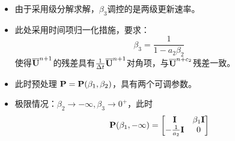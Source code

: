 \documentclass[aspectratio=169,serif]{beamer} %
\begin{document}
\begin{frame}{\secname}
  \begin{itemize}
    \item 由于采用级分解求解，$\beta_3$调控的是两级更新速率。
    \item 此处采用时间项归一化措施，要求：
          \begin{equation}
            \beta_3 = \frac{1}{1-a_2\beta_2}
          \end{equation}
          使得$\overline{\mathbf{U}}^{n+1}$的残差具有$\frac{1}{{\Delta} t}{\overline{\mathbf{U}}^{n+1}}$对角项，与$\overline{\mathbf{U}}^{n+c_2}$残差一致。
    \item 此时预处理 $\mathbf{P}=\mathbf{P}(\beta_1,\beta_2)$，具有两个可调参数。
    \item 极限情况：$\beta_2\rightarrow-\infty, \beta_3\rightarrow 0^+$，此时
          \begin{equation}
            \mathbf{P}(\beta_1,-\infty) = \begin{bmatrix}
              \mathbf{I}                 & \beta_1 \mathbf{I} \\
              - \frac{1}{a_2} \mathbf{I} & 0            \\
            \end{bmatrix}
          \end{equation}
  \end{itemize}
\end{frame}
\end{document}
